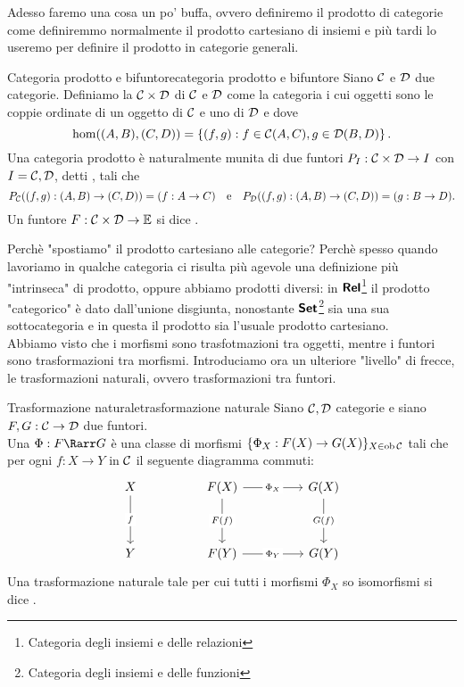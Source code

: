 \documentclass{article}
\renewcommand\C{\mc{C}}
\newcommand\D{\mc{D}}
\begin{document}
Adesso faremo una cosa un po' buffa, ovvero definiremo il prodotto di categorie come definiremmo normalmente il prodotto cartesiano di insiemi e più tardi lo useremo per definire il prodotto in categorie generali.

\begin{definition}{Categoria prodotto e bifuntore}{categoria prodotto e bifuntore}
    Siano $\C$ e $\D$ due categorie. Definiamo la  $\C\times\D$ di $\C$ e $\D$ come la categoria i cui oggetti sono le coppie ordinate di un oggetto di $\C$ e uno di $\D$ e dove
    \[ \hom((A,B),(C,D)) = \left\{ (f,g) : f \in \C(A,C), g \in \D(B,D) \right\}. \]
    Una categoria prodotto è naturalmente munita di due funtori $P_I : \C\times\D\to I$ con $I = \C,\D$, detti , tali che
    \[ P_\C ((f,g):(A,B)\to(C,D)) = (f:A\to C) \quad\text{e}\quad P_\D ((f,g):(A,B)\to(C,D)) = (g:B\to D).\]
    Un funtore $F:\C\times\D\to \E$ si dice .
\end{definition}

Perchè "spostiamo" il prodotto cartesiano alle categorie? Perchè spesso quando lavoriamo in qualche categoria ci risulta più agevole una definizione più "intrinseca" di prodotto, oppure abbiamo prodotti diversi: in $\text{\sffamily\textbf{Rel}}$\footnote{Categoria degli insiemi e delle relazioni} il prodotto "categorico" è dato dall'unione disgiunta, nonostante $\text{\sffamily\textbf{Set}}$\footnote{Categoria degli insiemi e delle funzioni} sia una sua sottocategoria e in questa il prodotto sia l'usuale prodotto cartesiano.\\
Abbiamo visto che i morfismi sono trasfotmazioni tra oggetti, mentre i funtori sono trasformazioni tra morfismi. Introduciamo ora un ulteriore "livello" di frecce, le trasformazioni naturali, ovvero trasformazioni tra funtori.

\begin{definition}{Trasformazione naturale}{trasformazione naturale}
    Siano $\C,\D$ categorie e siano $F,G : \C\to\D $ due funtori.\\
    Una  $\Phi:F\Rarr G$ è una classe di morfismi $\{\Phi_X : F(X)\to G(X)\}_{X\in\ob\C}$ tali che per ogni $f:X\to Y$ in $\C$ il seguente diagramma commuti:
    \[\begin{tikzcd}
    	X && {F(X)} && {G(X)} \\
    	\\
    	Y && {F(Y)} && {G(Y)}
    	\arrow["f"{description}, from=1-1, to=3-1]
    	\arrow["{\Phi_X}"{description}, from=1-3, to=1-5]
    	\arrow["{F(f)}"{description}, from=1-3, to=3-3]
    	\arrow["{G(f)}"{description}, from=1-5, to=3-5]
	    \arrow["{\Phi_Y}"{description}, from=3-3, to=3-5]
    \end{tikzcd}\]
    Una trasformazione naturale tale per cui tutti i morfismi $\Phi_X$ so isomorfismi si dice .
\end{definition}
\end{document}
